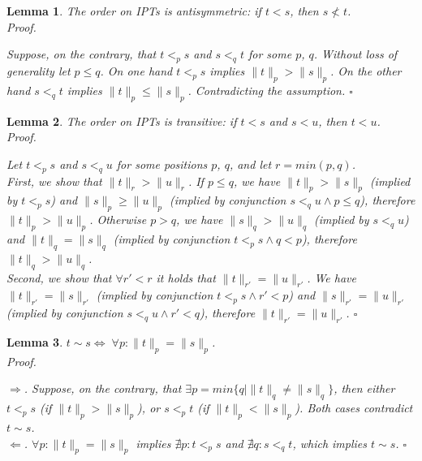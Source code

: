 \documentclass[AMA,STIX1COL]{WileyNJD-v2}
\newtheorem{XLem}{Lemma}
\begin{document}
    \begin{XLem}\label{lemma_ptorder_antisymmetry}
    The order on IPTs is antisymmetric: if $t < s$, then $s \not< t$.
    \\
    Proof.

    Suppose, on the contrary, that $t <_p s$ and $s <_q t$ for some $p$, $q$.
    Without loss of generality let $p \leq q$.
    On one hand $t <_p s$ implies $\|t\|_p > \|s\|_p$.
    On the other hand $s <_q t$ implies $\|t\|_p \leq \|s\|_p$.
    Contradicting the assumption.
    $\square$
    \end{XLem}

    \begin{XLem}\label{lemma_ptorder_transitivity}
    The order on IPTs is transitive: if $t < s$ and $s < u$, then $t < u$.
    \\
    Proof.

    Let $t <_p s$ and $s <_q u$ for some positions $p$, $q$, and let $r = min (p, q)$.
    \\[-1em]

    First, we show that $\|t\|_r > \|u\|_r$.
    If $p \leq q$, we have $\|t\|_p > \|s\|_p$ (implied by $t <_p s$)
    and $\|s\|_p \geq \|u\|_p$ (implied by conjunction $s <_q u \wedge p \leq q$),
    therefore $\|t\|_p > \|u\|_p$.
    Otherwise $p > q$, we have $\|s\|_q > \|u\|_q$ (implied by $s <_q u$)
    and $\|t\|_q = \|s\|_q$ (implied by conjunction $t <_p s \wedge q < p$),
    therefore $\|t\|_q > \|u\|_q$.
    \\[-1em]

    Second, we show that $\forall r' < r$ it holds that $\|t\|_{r'} = \|u\|_{r'}$.
    We have $\|t\|_{r'} = \|s\|_{r'}$ (implied by conjunction $t <_p s \wedge r' < p$)
    and $\|s\|_{r'} = \|u\|_{r'}$ (implied by conjunction $s <_q u \wedge r' < q$),
    therefore $\|t\|_{r'} = \|u\|_{r'}$.
    $\square$
    \end{XLem}

    \begin{XLem}\label{incomparability_equivdef}
    $t \sim s \Leftrightarrow \; \forall p : \|t\|_p = \|s\|_p$.
    \\
    Proof.

    $\Rightarrow$. %
    Suppose, on the contrary, that $\exists p = min \{ q \mid \|t\|_q \neq \|s\|_q \}$,
    then either $t <_p s$ (if $\|t\|_p > \|s\|_p$), or $s <_p t$ (if $\|t\|_p < \|s\|_p$).
    Both cases contradict $t \sim s$.
    \\[-1em]

    $\Leftarrow$.
    $\forall p : \|t\|_p = \|s\|_p$ implies
    $\nexists p : t <_p s$ and $\nexists q : s <_q t$,
    which implies $t \sim s$.
    $\square$
    \end{XLem}
\end{document}
